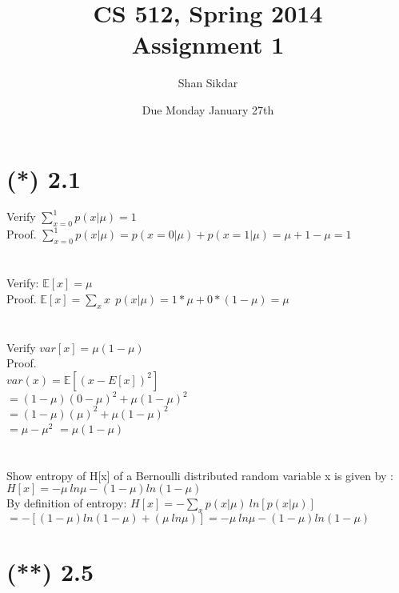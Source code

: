 \documentclass[11pt,leqno,fleqn]{article}
\title{CS 512, Spring 2014
       \\[1ex]
       \textbf{Assignment 1}}
\author{Shan Sikdar}
\date{Due Monday January 27th} %
\begin{document}
\maketitle

\section{(*) 2.1 }
Verify $ \sum\limits_{x=0}^1 p(x | \mu) =1 $ \\
Proof.  $  \sum\limits_{x=0}^1 p(x | \mu) = p( x = 0 | \mu) + p( x= 1 | \mu) =  \mu + 1 - \mu = 1 $\\
\\
\\
Verify: $\mathbb{E}[x] = \mu$\\
Proof.   $\mathbb{E}[x] =  \sum\limits_{x} x \ \  p(x | \mu)  = 1* \mu + 0*(1 - \mu) = \mu$\\
\\
\\
Verify $var[x] = \mu (1 - \mu) $\\
Proof.  \\
$var(x) = \mathbb{E}[(x - E[x])^2]$\\
$= (1 - \mu )(0 - \mu)^2  + \mu (1 - \mu)^2$\\
$= (1 - \mu )(\mu)^2  + \mu (1 - \mu)^2$\\
$ = \mu - \mu^2 $ $ = \mu(1-\mu)$\\
\\
\\
Show entropy of H[x] of a Bernoulli distributed random variable x is given by : $H[x] = - \mu \  ln \mu - ( 1- \mu) ln(1-\mu)$\\
By definition of entropy: $ H[x] = - \sum\limits_{x} p(x | \mu)  \ ln[p(x | \mu)]  $\\
$= -[ (1 - \mu) ln(1-\mu) + (\mu \ ln \mu)]  =  - \mu \  ln \mu - ( 1- \mu) ln(1-\mu)$

\section{(**) 2.5}

\section{}
\end{document}

